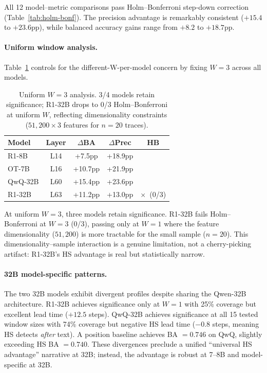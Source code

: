 \documentclass[11pt,a4paper]{article}
\newcommand{\pp}{\text{pp}}
\newcommand{\cmark}{\checkmark}
\newcommand{\xmark}{$\times$}
\begin{document}
All 12 model--metric comparisons pass Holm--Bonferroni step-down correction (Table~\ref{tab:holm-bonf}).
The precision advantage is remarkably consistent ($+15.4$ to $+23.6\pp$), while balanced accuracy gains range from $+8.2$ to $+18.7\pp$.

\paragraph{Uniform window analysis.}
Table~\ref{tab:uniform-w} controls for the different-W-per-model concern by fixing $W=3$ across all models.

\begin{table}[t]
\centering
\small
\begin{tabular}{lcccc}
\toprule
\textbf{Model} & \textbf{Layer} & \textbf{$\Delta$BA} & \textbf{$\Delta$Prec} & \textbf{HB} \\
\midrule
R1-8B & L14 & +7.5$\pp$ & +18.9$\pp$ & \cmark \\
OT-7B & L16 & +10.7$\pp$ & +21.9$\pp$ & \cmark \\
QwQ-32B & L60 & +15.4$\pp$ & +23.6$\pp$ & \cmark \\
R1-32B & L63 & +11.2$\pp$ & +13.0$\pp$ & \xmark~(0/3) \\
\bottomrule
\end{tabular}
\caption{Uniform $W=3$ analysis. 3/4 models retain significance; R1-32B drops to 0/3 Holm--Bonferroni at uniform $W$, reflecting dimensionality constraints ($51{,}200 \times 3$ features for $n=20$ traces).}
\label{tab:uniform-w}
\end{table}

At uniform $W=3$, three models retain significance.
R1-32B fails Holm--Bonferroni at $W=3$ (0/3), passing only at $W=1$ where the feature dimensionality ($51{,}200$) is more tractable for the small sample ($n=20$).
This dimensionality--sample interaction is a genuine limitation, not a cherry-picking artifact: R1-32B's HS advantage is real but statistically narrow.

\paragraph{32B model-specific patterns.}
The two 32B models exhibit divergent profiles despite sharing the Qwen-32B architecture.
R1-32B achieves significance only at $W=1$ with 25\% coverage but excellent lead time ($+12.5$ steps).
QwQ-32B achieves significance at all 15 tested window sizes with 74\% coverage but negative HS lead time ($-0.8$ steps, meaning HS detects \emph{after} text).
A position baseline achieves BA $= 0.746$ on QwQ, slightly exceeding HS BA $= 0.740$.
These divergences preclude a unified ``universal HS advantage'' narrative at 32B; instead, the advantage is robust at 7--8B and model-specific at 32B.
\end{document}
